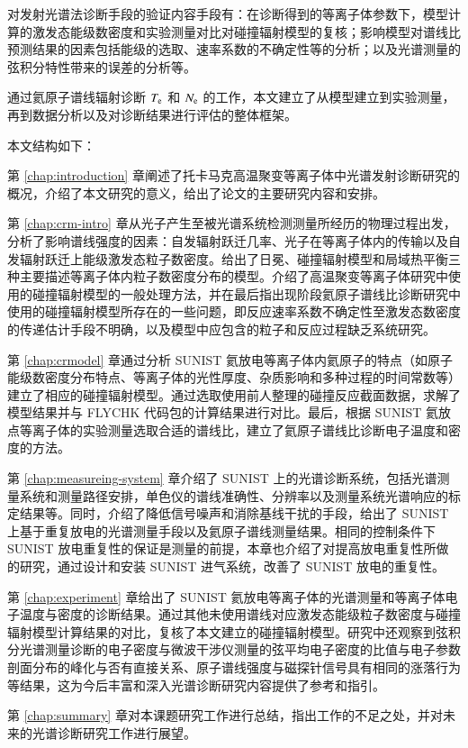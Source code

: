 对发射光谱法诊断手段的验证内容手段有：在诊断得到的等离子体参数下，模型计算的激发态能级数密度和实验测量对比对碰撞辐射模型的复核；影响模型对谱线比预测结果的因素\pozhehao 包括能级的选取、速率系数的不确定性等\pozhehao 的分析；以及光谱测量的弦积分特性带来的误差的分析等。


通过氦原子谱线辐射诊断 $T_{\rm e}$ 和 $N_{\rm e}$ 的工作，本文建立了从模型建立到实验测量，再到数据分析以及对诊断结果进行评估的整体框架。

本文结构如下：

第 \ref{chap:introduction} 章阐述了托卡马克高温聚变等离子体中光谱发射诊断研究的概况，介绍了本文研究的意义，给出了论文的主要研究内容和安排。

第 \ref{chap:crm-intro} 章从光子产生至被光谱系统检测测量所经历的物理过程出发，分析了影响谱线强度的因素：自发辐射跃迁几率、光子在等离子体内的传输以及自发辐射跃迁上能级激发态粒子数密度。给出了日冕、碰撞辐射模型和局域热平衡三种主要描述等离子体内粒子数密度分布的模型。介绍了高温聚变等离子体研究中使用的碰撞辐射模型的一般处理方法，并在最后指出现阶段氦原子谱线比诊断研究中使用的碰撞辐射模型所存在的一些问题，即反应速率系数不确定性至激发态数密度的传递估计手段不明确，以及模型中应包含的粒子和反应过程缺乏系统研究。

第 \ref{chap:crmodel} 章通过分析 SUNIST 氦放电等离子体内氦原子的特点（如原子能级数密度分布特点、等离子体的光性厚度、杂质影响和多种过程的时间常数等）建立了相应的碰撞辐射模型。通过选取使用前人整理的碰撞反应截面数据，求解了模型结果并与 FLYCHK 代码包的计算结果进行对比。最后，根据 SUNIST 氦放点等离子体的实验测量选取合适的谱线比，建立了氦原子谱线比诊断电子温度和密度的方法。

第 \ref{chap:measureing-system} 章介绍了 SUNIST 上的光谱诊断系统，包括光谱测量系统和测量路径安排，单色仪的谱线准确性、分辨率以及测量系统光谱响应的标定结果等。同时，介绍了降低信号噪声和消除基线干扰的手段，给出了 SUNIST 上基于重复放电的光谱测量手段以及氦原子谱线测量结果。相同的控制条件下 SUNIST 放电重复性的保证是测量的前提，本章也介绍了对提高放电重复性所做的研究，通过设计和安装 SUNIST 进气系统，改善了 SUNIST 放电的重复性。

第 \ref{chap:experiment} 章给出了 SUNIST 氦放电等离子体的光谱测量和等离子体电子温度与密度的诊断结果。通过其他未使用谱线对应激发态能级粒子数密度与碰撞辐射模型计算结果的对比，复核了本文建立的碰撞辐射模型。研究中还观察到弦积分光谱测量诊断的电子密度与微波干涉仪测量的弦平均电子密度的比值与电子参数剖面分布的峰化与否有直接关系、原子谱线强度与磁探针信号具有相同的涨落行为等结果，这为今后丰富和深入光谱诊断研究内容提供了参考和指引。

第 \ref{chap:summary} 章对本课题研究工作进行总结，指出工作的不足之处，并对未来的光谱诊断研究工作进行展望。

